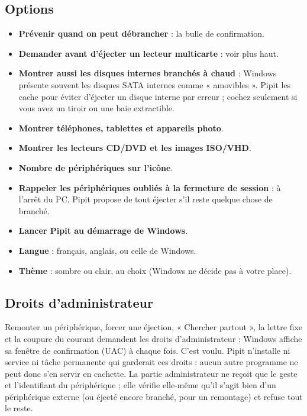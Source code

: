 \subsection{Options}
\begin{itemize}
\item \textbf{Prévenir quand on peut débrancher} : la bulle de confirmation.
\item \textbf{Demander avant d'éjecter un lecteur multicarte} : voir plus haut.
\item \textbf{Montrer aussi les disques internes branchés à chaud} : Windows présente
  souvent les disques SATA internes comme « amovibles ». Pipit les cache pour éviter
  d'éjecter un disque interne par erreur ; cochez seulement si vous avez un tiroir
  ou une baie extractible.
\item \textbf{Montrer téléphones, tablettes et appareils photo}.
\item \textbf{Montrer les lecteurs CD/DVD et les images ISO/VHD}.
\item \textbf{Nombre de périphériques sur l'icône}.
\item \textbf{Rappeler les périphériques oubliés à la fermeture de session} : à l'arrêt du
  PC, Pipit propose de tout éjecter s'il reste quelque chose de branché.
\item \textbf{Lancer Pipit au démarrage de Windows}.
\item \textbf{Langue} : français, anglais, ou celle de Windows.
\item \textbf{Thème} : sombre ou clair, au choix (Windows ne décide pas à votre place).
\end{itemize}

\subsection{Droits d'administrateur}\label{sec:assistant}
Remonter un périphérique, forcer une éjection, « Chercher partout », la lettre fixe et la coupure du
courant demandent les droits
d'administrateur : Windows affiche sa fenêtre de confirmation (UAC) à chaque fois. C'est
voulu. Pipit n'installe ni service ni tâche permanente qui garderait ces droits : aucun
autre programme ne peut donc s'en servir en cachette. La partie administrateur ne reçoit
que le geste et l'identifiant du périphérique ; elle vérifie elle-même qu'il s'agit bien
d'un périphérique externe (ou éjecté encore branché, pour un remontage) et refuse tout le
reste.


